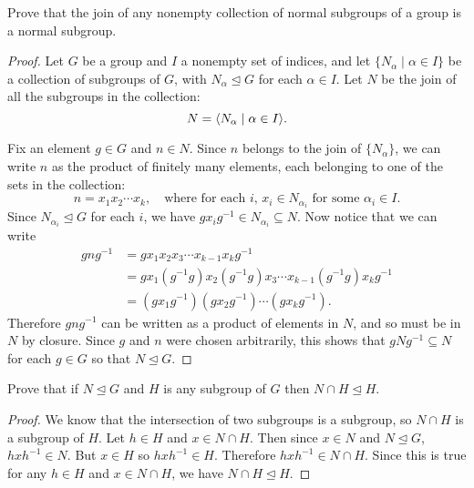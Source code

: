  Prove that the join of any nonempty collection of normal
subgroups of a group is a normal subgroup.
\begin{proof}
  Let $G$ be a group and $I$ a nonempty set of indices, and let
  $\{N_\alpha\mid\alpha\in I\}$ be a collection of subgroups of $G$,
  with $N_\alpha\trianglelefteq G$ for each $\alpha\in I$. Let $N$ be
  the join of all the subgroups in the collection:
  \begin{equation*}
    N = \langle{N_\alpha \mid \alpha\in I}\rangle.
  \end{equation*}

  Fix an element $g\in G$ and $n\in N$. Since $n$ belongs to the join
  of $\{N_\alpha\}$, we can write $n$ as the product of finitely many
  elements, each belonging to one of the sets in the collection:
  \begin{equation*}
    n = x_1x_2\cdots x_k,
    \quad\text{where for each $i$,
      $x_i\in N_{\alpha_i}$ for some $\alpha_i\in I$}.
  \end{equation*}
  Since $N_{\alpha_i}\trianglelefteq G$ for each $i$, we have
  $gx_ig^{-1}\in N_{\alpha_i}\subseteq N$. Now notice that we can
  write
  \begin{align*}
    gng^{-1}
    &= gx_1x_2x_3\cdots x_{k-1}x_kg^{-1} \\
    &= gx_1(g^{-1}g)x_2(g^{-1}g)x_3\cdots x_{k-1}(g^{-1}g)x_kg^{-1} \\
    &= (gx_1g^{-1})(gx_2g^{-1})\cdots(gx_kg^{-1}).
  \end{align*}
  Therefore $gng^{-1}$ can be written as a product of elements in $N$,
  and so must be in $N$ by closure. Since $g$ and $n$ were chosen
  arbitrarily, this shows that $gNg^{-1}\subseteq N$ for each $g\in G$
  so that $N\trianglelefteq G$.
\end{proof}

 Prove that if $N\trianglelefteq G$ and $H$ is any
subgroup of $G$ then $N\cap H\trianglelefteq H$.
\begin{proof}
  We know that the intersection of two subgroups is a subgroup, so
  $N\cap H$ is a subgroup of $H$. Let $h\in H$ and $x\in N\cap
  H$. Then since $x\in N$ and $N\trianglelefteq G$, $hxh^{-1}\in
  N$. But $x\in H$ so $hxh^{-1}\in H$. Therefore
  $hxh^{-1}\in N\cap H$. Since this is true for any $h\in H$ and
  $x\in N\cap H$, we have $N\cap H\trianglelefteq H$.
\end{proof}

